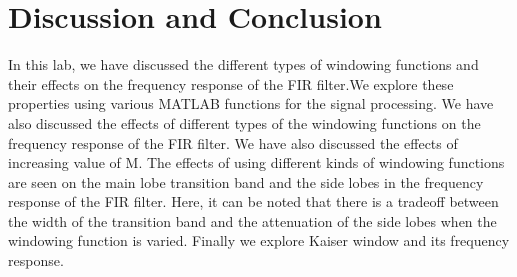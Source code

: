 \documentclass[a4paper,11pt]{article}
\begin{document}
\section{Discussion and Conclusion}
In this lab, we have discussed the different types of windowing functions and their effects on the frequency response of the FIR filter.We explore these properties using various MATLAB functions for the signal processing. We have also discussed the effects of different types of the windowing functions on the frequency response of the FIR filter. We have also discussed the effects of increasing value of M. The effects of using different kinds of windowing functions are seen on the main lobe transition band and the side lobes in the frequency response of the FIR filter. Here, it can be noted that there is a tradeoff between the width of the transition band and the attenuation of the side lobes when the windowing function is varied. Finally we explore Kaiser window and its frequency response.
\end{document}

